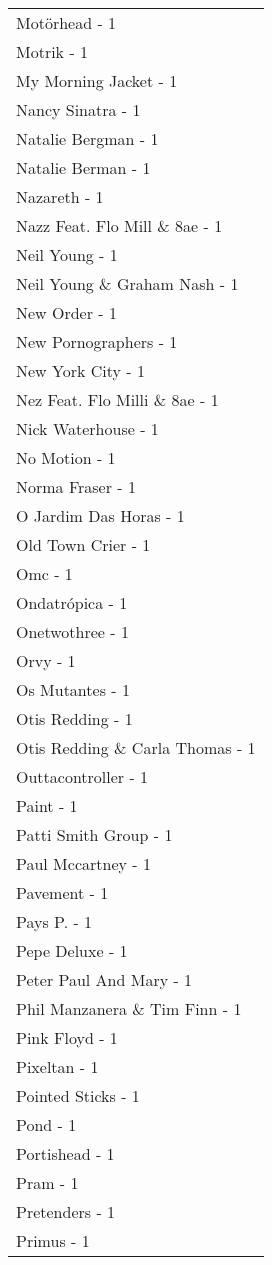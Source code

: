 \documentclass[
]{article}
\begin{document}
\begin{longtable}{l}
Motörhead - 1 \\ 
Motrik - 1 \\ 
My Morning Jacket - 1 \\ 
Nancy Sinatra - 1 \\ 
Natalie Bergman - 1 \\ 
Natalie Berman - 1 \\ 
Nazareth - 1 \\ 
Nazz Feat. Flo Mill \& 8ae - 1 \\ 
Neil Young - 1 \\ 
Neil Young \& Graham Nash - 1 \\ 
New Order - 1 \\ 
New Pornographers - 1 \\ 
New York City - 1 \\ 
Nez Feat. Flo Milli \& 8ae - 1 \\ 
Nick Waterhouse - 1 \\ 
No Motion - 1 \\ 
Norma Fraser - 1 \\ 
O Jardim Das Horas - 1 \\ 
Old Town Crier - 1 \\ 
Omc - 1 \\ 
Ondatrópica - 1 \\ 
Onetwothree - 1 \\ 
Orvy - 1 \\ 
Os Mutantes - 1 \\ 
Otis Redding - 1 \\ 
Otis Redding \& Carla Thomas - 1 \\ 
Outtacontroller - 1 \\ 
Paint - 1 \\ 
Patti Smith Group - 1 \\ 
Paul Mccartney - 1 \\ 
Pavement - 1 \\ 
Pays P. - 1 \\ 
Pepe Deluxe - 1 \\ 
Peter Paul And Mary - 1 \\ 
Phil Manzanera \& Tim Finn - 1 \\ 
Pink Floyd - 1 \\ 
Pixeltan - 1 \\ 
Pointed Sticks - 1 \\ 
Pond - 1 \\ 
Portishead - 1 \\ 
Pram - 1 \\ 
Pretenders - 1 \\ 
Primus - 1 \\ 

\end{longtable}
\end{document}
